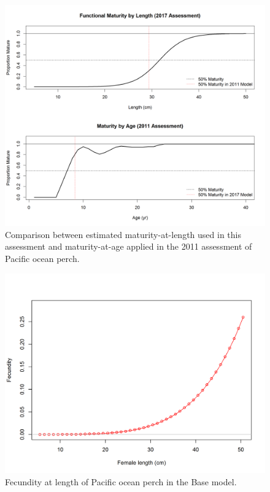 \documentclass[12pt,]{article}
\begin{document}
\begin{figure}
\centering
\includegraphics{Figures/Maturity_Comparison.png}
\caption{Comparison between estimated maturity-at-length used in this
assessment and maturity-at-age applied in the 2011 assessment of Pacific
ocean perch. \label{fig:mat_compare}}
\end{figure}

\begin{figure}
\centering
\includegraphics{r4ss/plots_mod1/bio9_fecundity_len.png}
\caption{Fecundity at length of Pacific ocean perch in the Base model.
\label{fig:fecundity}}
\end{figure}
\end{document}
